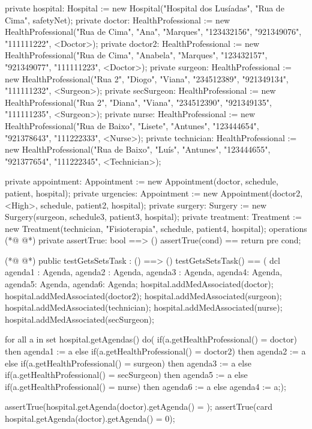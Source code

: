 \begin{vdmpp}[breaklines=true]
  private hospital: Hospital := new Hospital("Hospital dos Lusíadas", "Rua de Cima", safetyNet);
  private doctor: HealthProfessional := new HealthProfessional("Rua de Cima", "Ana", "Marques", "123432156", "921349076", "111111222", <Doctor>);
  private doctor2: HealthProfessional := new HealthProfessional("Rua de Cima", "Anabela", "Marques", "123432157", "921349077", "111111223", <Doctor>);
  private surgeon: HealthProfessional := new HealthProfessional("Rua 2", "Diogo", "Viana", "234512389", "921349134", "111111232", <Surgeon>);
  private secSurgeon: HealthProfessional := new HealthProfessional("Rua 2", "Diana", "Viana", "234512390", "921349135", "111111235", <Surgeon>);
 private nurse: HealthProfessional := new HealthProfessional("Rua de Baixo", "Lisete", "Antunes", "123444654", "921378643", "111222333", <Nurse>);
 private technician: HealthProfessional := new HealthProfessional("Rua de Baixo", "Luís", "Antunes", "123444655", "921377654", "111222345", <Technician>);
 
 private appointment: Appointment := new Appointment(doctor, schedule, patient, hospital);
 private urgencies: Appointment := new Appointment(doctor2, <High>, schedule, patient2, hospital);
 private surgery: Surgery := new Surgery(surgeon, schedule3, patient3, hospital);
 private treatment: Treatment := new Treatment(technician, "Fisioterapia", schedule, patient4, hospital);
operations
(*@
\label{assertTrue:57}
@*)
 private assertTrue: bool ==> ()
  assertTrue(cond) == return
 pre cond;
 
(*@
\label{testGetsSetsTask:61}
@*)
 public testGetsSetsTask : () ==> ()
  testGetsSetsTask() == (
   dcl agenda1 : Agenda, agenda2 : Agenda, agenda3 : Agenda, agenda4: Agenda, agenda5: Agenda, agenda6: Agenda;
   hospital.addMedAssociated(doctor);
   hospital.addMedAssociated(doctor2);
   hospital.addMedAssociated(surgeon);
   hospital.addMedAssociated(technician);
   hospital.addMedAssociated(nurse);
   hospital.addMedAssociated(secSurgeon);
   
   for all a in set hospital.getAgendas() do(
    if(a.getHealthProfessional() = doctor)
     then agenda1 := a
    else if(a.getHealthProfessional() = doctor2)
     then agenda2 := a
    else if(a.getHealthProfessional() = surgeon)
     then agenda3 := a
    else if(a.getHealthProfessional() = secSurgeon)
     then agenda5 := a
    else if(a.getHealthProfessional() = nurse)
     then agenda6 := a
    else
     agenda4 := a;);
   
   assertTrue(hospital.getAgenda(doctor).getAgenda() = {});
   assertTrue(card hospital.getAgenda(doctor).getAgenda() = 0);
   

\end{vdmpp}
